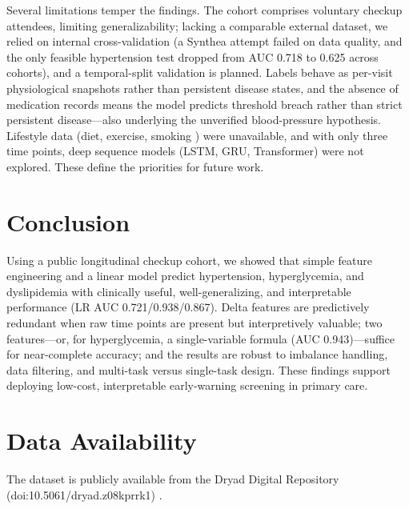 \documentclass[journal]{IEEEtran}
\begin{document}
Several limitations temper the findings. The cohort comprises voluntary checkup attendees, limiting generalizability; lacking a comparable external dataset, we relied on internal cross-validation (a Synthea \cite{ref37} attempt failed on data quality, and the only feasible hypertension test dropped from AUC 0.718 to 0.625 across cohorts), and a temporal-split validation is planned. Labels behave as per-visit physiological snapshots rather than persistent disease states, and the absence of medication records means the model predicts threshold breach rather than strict persistent disease---also underlying the unverified blood-pressure hypothesis. Lifestyle data (diet, exercise, smoking \cite{ref36}) were unavailable, and with only three time points, deep sequence models (LSTM, GRU, Transformer) were not explored. These define the priorities for future work.

\section{Conclusion}
Using a public longitudinal checkup cohort, we showed that simple feature engineering and a linear model predict hypertension, hyperglycemia, and dyslipidemia with clinically useful, well-generalizing, and interpretable performance (LR AUC 0.721/0.938/0.867). Delta features are predictively redundant when raw time points are present but interpretively valuable; two features---or, for hyperglycemia, a single-variable formula (AUC 0.943)---suffice for near-complete accuracy; and the results are robust to imbalance handling, data filtering, and multi-task versus single-task design. These findings support deploying low-cost, interpretable early-warning screening in primary care.

\section*{Data Availability}
The dataset is publicly available from the Dryad Digital Repository (doi:10.5061/dryad.z08kprrk1) \cite{ref21}.
\end{document}
